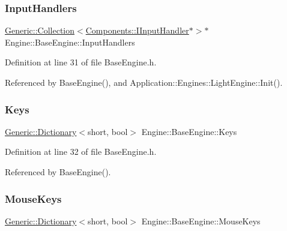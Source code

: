 \mbox{\label{classEngine_1_1BaseEngine_a134fa082c5a64d62b76ddf926647e7cc}} 
\subsubsection{\texorpdfstring{Input\+Handlers}{InputHandlers}}
{\footnotesize\ttfamily \mbox{\hyperlink{classGeneric_1_1Collection}{Generic\+::\+Collection}}$<$\mbox{\hyperlink{namespaceEngine_1_1Components_ac8d3da616707b57e065fd62e6701415f}{Components\+::\+I\+Input\+Handler}}$\ast$$>$$\ast$ Engine\+::\+Base\+Engine\+::\+Input\+Handlers}



Definition at line 31 of file Base\+Engine.\+h.



Referenced by Base\+Engine(), and Application\+::\+Engines\+::\+Light\+Engine\+::\+Init().

\mbox{\label{classEngine_1_1BaseEngine_a65321a97e83f0a6ee90df3efac2d3307}} 
\subsubsection{\texorpdfstring{Keys}{Keys}}
{\footnotesize\ttfamily \mbox{\hyperlink{classGeneric_1_1Dictionary}{Generic\+::\+Dictionary}}$<$short, bool$>$ Engine\+::\+Base\+Engine\+::\+Keys}



Definition at line 32 of file Base\+Engine.\+h.



Referenced by Base\+Engine().

\mbox{\label{classEngine_1_1BaseEngine_a3ee2bdddb66d45b8c808ffd937ba9c50}} 
\subsubsection{\texorpdfstring{Mouse\+Keys}{MouseKeys}}
{\footnotesize\ttfamily \mbox{\hyperlink{classGeneric_1_1Dictionary}{Generic\+::\+Dictionary}}$<$short, bool$>$ Engine\+::\+Base\+Engine\+::\+Mouse\+Keys}



